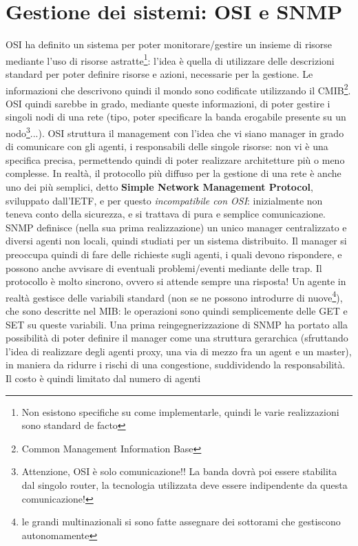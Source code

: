 \section{Gestione dei sistemi: OSI e SNMP}
OSI ha definito un sistema per poter monitorare/gestire un insieme di risorse
mediante l'uso di risorse
astratte\footnote{Non esistono specifiche su come implementarle, quindi le varie
realizzazioni sono standard de facto}:
l'idea è quella di utilizzare delle descrizioni standard per poter definire
risorse e azioni, necessarie per la
gestione. Le informazioni che descrivono quindi il mondo sono codificate
utilizzando il CMIB\footnote{Common Management
Information Base}. OSI quindi sarebbe in grado, mediante queste informazioni, di
poter gestire i singoli nodi di una
rete (tipo, poter specificare la banda erogabile presente su un
nodo\footnote{Attenzione, OSI è solo comunicazione!! La
banda dovrà poi essere stabilita dal singolo router, la tecnologia utilizzata
deve essere indipendente da questa
comunicazione!}...).
OSI struttura il management con l'idea che vi siano manager in grado di
comunicare con gli agenti, i responsabili
delle singole risorse: non vi è una specifica precisa, permettendo quindi di
poter realizzare architetture più o meno
complesse.
In realtà, il protocollo più diffuso per la gestione di una rete è anche uno dei
più semplici, detto \textbf{Simple
Network Management Protocol}, sviluppato dall'IETF, e per questo
\textit{incompatibile con OSI}: inizialmente non
teneva conto della sicurezza, e si trattava di pura e semplice comunicazione.
SNMP definisce (nella sua prima realizzazione) un unico manager centralizzato e
diversi agenti non locali, quindi
studiati per un sistema distribuito. Il manager si preoccupa quindi di fare
delle richieste sugli agenti, i quali
devono rispondere, e possono anche avvisare di eventuali problemi/eventi
mediante delle trap. Il protocollo è molto
sincrono, ovvero si attende sempre una risposta!
Un agente in realtà gestisce delle variabili standard (non se ne possono
introdurre di nuove\footnote{le grandi
multinazionali si sono fatte assegnare dei sottorami che gestiscono
autonomamente}), che sono descritte nel MIB: le
operazioni sono quindi semplicemente delle GET e SET su queste variabili.
Una prima reingegnerizzazione di SNMP ha portato alla possibilità di poter
definire il manager come una struttura
gerarchica (sfruttando l'idea di realizzare degli agenti proxy, una via di mezzo
fra un agent e un master), in maniera
da ridurre i rischi di una congestione, suddividendo la responsabilità. Il costo
è quindi limitato dal numero di agenti

